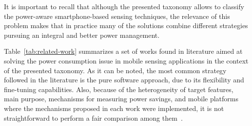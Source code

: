 \documentclass[ENG,PhD]{cinvestav}
\begin{document}
It is important to recall that although the presented taxonomy allows to classify the power-aware smartphone-based sensing techniques, the relevance of this problem makes that in practice many of the solutions combine different strategies pursuing an integral and better power management.

Table~\ref{tab:related-work} summarizes a set of works found in literature aimed at solving the power consumption issue in mobile sensing applications in the context of the presented taxonomy.
As it can be noted, the most common strategy followed in the literature is the pure software approach, due to its flexibility and fine-tuning capabilities.
Also, because of the heterogeneity of target features, main purpose, mechanisms for measuring power savings, and mobile platforms where the mechanisms proposed in each work were implemented, it is not straightforward to perform a fair comparison among them~\cite{Vallina-Rodriguez2013,Neely2008}.
\end{document}
